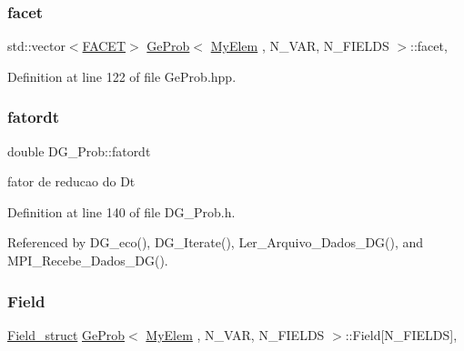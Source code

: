 \subsubsection{\texorpdfstring{facet}{facet}}
{\footnotesize\ttfamily std\+::vector$<$\hyperlink{structFACET}{F\+A\+C\+ET}$>$ \hyperlink{classGeProb}{Ge\+Prob}$<$ \hyperlink{DG__Prob_8h_a83cd887ced9a6587428f267e50cd4787}{My\+Elem} , N\+\_\+\+V\+AR, N\+\_\+\+F\+I\+E\+L\+DS $>$\+::facet\hspace{0.3cm}{\ttfamily [protected]}, {\ttfamily [inherited]}}



Definition at line 122 of file Ge\+Prob.\+hpp.

\mbox{\label{classDG__Prob_a6cb8efeb65d87835ff8704d116bdc100}} 
\subsubsection{\texorpdfstring{fatordt}{fatordt}}
{\footnotesize\ttfamily double D\+G\+\_\+\+Prob\+::fatordt\hspace{0.3cm}{\ttfamily [private]}}



fator de reducao do Dt 



Definition at line 140 of file D\+G\+\_\+\+Prob.\+h.



Referenced by D\+G\+\_\+eco(), D\+G\+\_\+\+Iterate(), Ler\+\_\+\+Arquivo\+\_\+\+Dados\+\_\+\+D\+G(), and M\+P\+I\+\_\+\+Recebe\+\_\+\+Dados\+\_\+\+D\+G().

\mbox{\label{classGeProb_aaaeb3e022301e2df5e180af7900a352e}} 
\subsubsection{\texorpdfstring{Field}{Field}}
{\footnotesize\ttfamily \hyperlink{structField__struct}{Field\+\_\+struct} \hyperlink{classGeProb}{Ge\+Prob}$<$ \hyperlink{DG__Prob_8h_a83cd887ced9a6587428f267e50cd4787}{My\+Elem} , N\+\_\+\+V\+AR, N\+\_\+\+F\+I\+E\+L\+DS $>$\+::Field\mbox{[}N\+\_\+\+F\+I\+E\+L\+DS\mbox{]}\hspace{0.3cm}{\ttfamily [protected]}, {\ttfamily [inherited]}}



